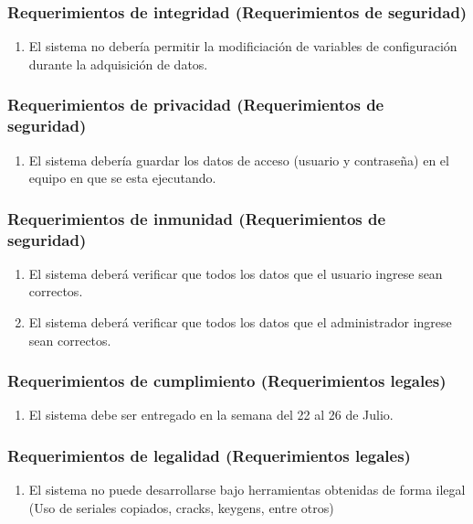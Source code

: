 \subsubsection{\textcolor[gray]{.2}{Requerimientos de integridad (Requerimientos
de seguridad)}}
\begin{enumerate}
\item El sistema no debería permitir la modificiación de variables de
configuración durante la adquisición de datos.
\end{enumerate}

\subsubsection{\textcolor[gray]{.2}{Requerimientos de privacidad (Requerimientos
de seguridad)}}
\begin{enumerate}
\item El sistema debería guardar los datos de acceso (usuario y contraseña) en
el equipo en que se esta ejecutando. 
\end{enumerate}

\subsubsection{\textcolor[gray]{.2}{Requerimientos de inmunidad
(Requerimientos de seguridad)}}
\begin{enumerate}
\item El sistema deberá verificar que todos los datos que el usuario ingrese
sean correctos.
\item El sistema deberá verificar que todos los datos que el administrador
ingrese sean correctos.
\end{enumerate}

\subsubsection{\textcolor[gray]{.2}{Requerimientos de cumplimiento
(Requerimientos legales)}}
\begin{enumerate}
\item El sistema debe ser entregado en la semana del 22 al 26 de Julio.
\end{enumerate}


\subsubsection{\textcolor[gray]{.2}{Requerimientos de legalidad (Requerimientos
legales)}}
\begin{enumerate}
\item El sistema no puede desarrollarse bajo herramientas obtenidas de forma
ilegal (Uso de seriales copiados, cracks, keygens, entre otros)
\end{enumerate}

